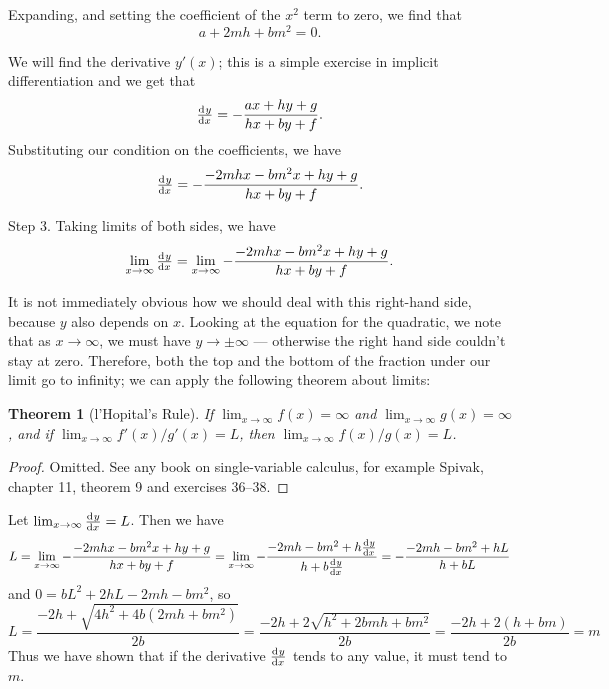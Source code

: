 \documentclass[a4paper,leqno,10pt]{article}
\theoremstyle{exercise}
\theoremstyle{plain}
\newtheorem*{thm}{Theorem}
\theoremstyle{definition}
\theoremstyle{remark}
\begin{document}
Expanding, and setting the coefficient of the $ x^2 $ term to zero, we find that
\begin{displaymath}
  a + 2mh + bm^2 = 0.
\end{displaymath}

We will find the derivative $ y'(x) $; this is a simple exercise in implicit differentiation and we get that
\begin{displaymath}
  \od{y}{x} = -\frac{ax + hy + g}{hx + by + f}.
\end{displaymath}
Substituting our condition on the coefficients, we have
\begin{displaymath}
  \od{y}{x} = -\frac{-2mhx - bm^2x + hy + g}{hx + by + f}.
\end{displaymath}

Step 3. Taking limits of both sides, we have
\begin{displaymath}
  \lim_{x \to \infty} \od{y}{x} = \lim_{x \to \infty} -\frac{-2mhx - bm^2x + hy + g}{hx + by + f}.
\end{displaymath}

It is not immediately obvious how we should deal with this right-hand side, because $ y $ also depends
on $ x $. Looking at the equation for the quadratic, we note that as $ x \to \infty $, we must have $ y \to \pm\infty $ ---
otherwise the right hand side couldn't stay at zero. Therefore, both the top and the bottom of the fraction under our
limit go to infinity; we can apply the following theorem about limits:

\begin{thm}[l'Hopital's Rule]
  If $ \lim_{x \to \infty} f(x) = \infty $ and $ \lim_{x \to \infty} g(x) = \infty $, and if $ \lim_{x\to\infty} f'(x)/g'(x) = L $,
  then $ \lim_{x\to\infty} f(x)/g(x) = L $.
\end{thm}
\begin{proof}
  Omitted. See any book on single-variable calculus, for example Spivak, chapter 11, theorem 9 and exercises 36--38.
\end{proof}

Let $ \lim_{x \to \infty} \od{y}{x} = L $. Then we have
\begin{displaymath}
  L = \lim_{x \to \infty} -\frac{-2mhx - bm^2x + hy + g}{hx + by + f} = \lim_{x \to \infty} -\frac{-2mh - bm^2 + h\od{y}{x}}{h + b\od{y}{x}}
                                                                      = -\frac{-2mh - bm^2 + hL}{h + bL}
\end{displaymath}
and $ 0 = bL^2 + 2hL - 2mh - bm^2 $, so
\begin{displaymath}
  L = \frac{-2h + \sqrt{4h^2 + 4b(2mh + bm^2)}}{2b} = \frac{-2h + 2\sqrt{h^2 + 2bmh + bm^2}}{2b}
                                                    = \frac{-2h + 2(h + bm)}{2b} = m
\end{displaymath}
Thus we have shown that if the derivative $ \od{y}{x} $ tends to any value, it must tend to $ m $.
\end{document}
